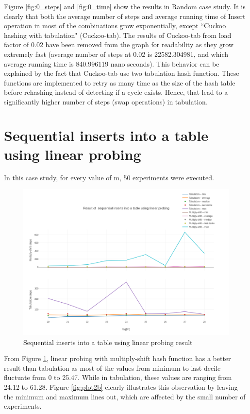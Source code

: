 \documentclass{article}
\begin{document}
Figure \ref{fig:0_steps} and \ref{fig:0_time} show the results in Random case study. It is clearly that both the average number of steps and average running time of Insert operation in most of the combinations grow exponentially, except ``Cuckoo hashing with tabulation" (Cuckoo-tab). The results of Cuckoo-tab from load factor of 0.02 have been removed from the graph for readability as they grow extremely fast (average number of steps at 0.02 is 22582.304981, and which average running time is 840.996119 nano seconds). This behavior can be explained by the fact that Cuckoo-tab use two tabulation hash function. These functions are implemented to retry as many time as the size of the hash table before rehashing instead of detecting if a cycle exists. Hence, that lead to a significantly higher number of steps (swap operations) in tabulation.

\section{Sequential inserts into a table using linear probing}
In this case study, for every value of m, 50 experiments were executed.

\begin{figure}[h!]
\centering
\includegraphics[width=\textwidth]{1.png}
\caption{Sequential inserts into a table using linear probing result}
\label{fig:plot2}
\end{figure}

From Figure \ref{fig:plot2}, linear probing with multiply-shift hash function has a better result than tabulation as most of the values from minimum to last decile fluctuate from 0 to 25.47. While in tabulation, these values are ranging from 24.12 to 61.28. Figure \ref{fig:plot2b} clearly illustrates this observation by leaving the minimum and maximum lines out, which are affected by the small number of experiments.
\end{document}
